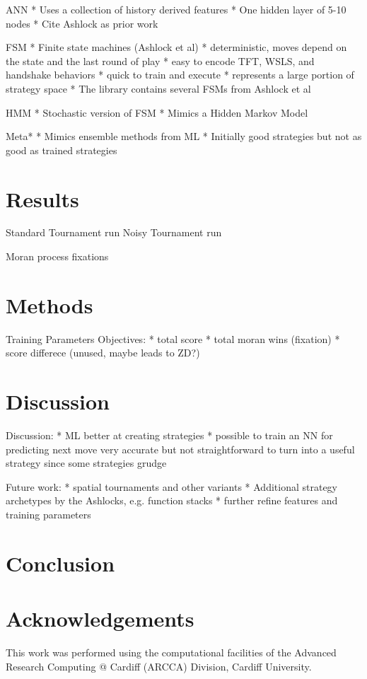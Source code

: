 \documentclass{article}
\begin{document}
ANN
* Uses a collection of history derived features
* One hidden layer of 5-10 nodes
* Cite Ashlock as prior work

FSM
* Finite state machines (Ashlock et al)
* deterministic, moves depend on the state and the last round of play
* easy to encode TFT, WSLS, and handshake behaviors
* quick to train and execute
* represents a large portion of strategy space
* The library contains several FSMs from Ashlock et al

HMM
* Stochastic version of FSM
* Mimics a Hidden Markov Model

Meta*
* Mimics ensemble methods from ML
* Initially good strategies but not as good as trained strategies

\section{Results}

Standard Tournament run
Noisy Tournament run

Moran process fixations


\section{Methods}

Training Parameters
Objectives:
* total score
* total moran wins (fixation)
* score differece (unused, maybe leads to ZD?)

\section{Discussion}

Discussion:
* ML better at creating strategies
* possible to train an NN for predicting next move very accurate
but not straightforward to turn into a useful strategy
since some strategies grudge

Future work:
* spatial tournaments and other variants
* Additional strategy archetypes by the Ashlocks, e.g. function stacks
* further refine features and training parameters


\section{Conclusion}\label{sec:conclusion}

\section*{Acknowledgements}

This work was performed using the computational facilities of the Advanced
Research Computing @ Cardiff (ARCCA) Division, Cardiff University.

\printbibliography
\end{document}
